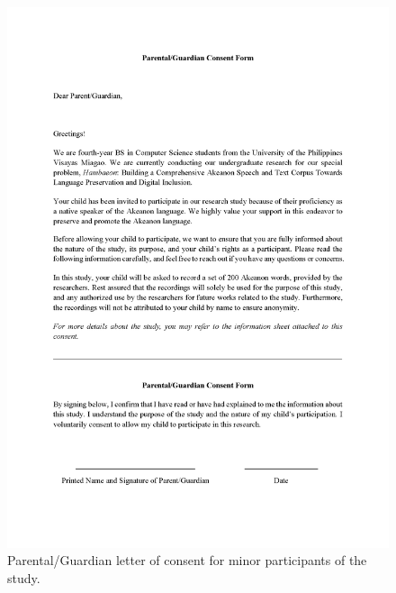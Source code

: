 \begin{figure}[h!]
    \centering
    \includegraphics[width=\textwidth]{./appendix/letters_Page_2.png}
    \caption{Parental/Guardian letter of consent for minor participants of the study.}
    \label{fig:parentalConsent}
\end{figure}

